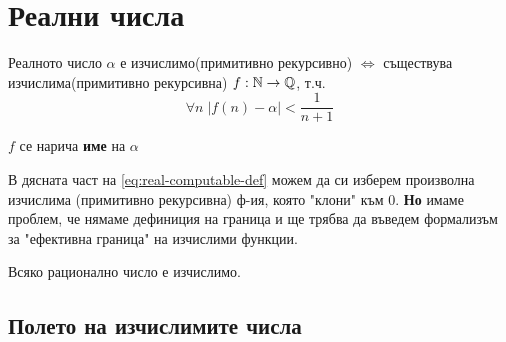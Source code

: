 \section{Реални числа}
\begin{definition}
    Реалното число $\alpha$ е изчислимо(примитивно рекурсивно) $\iff$ съществува изчислима(примитивно рекурсивна) $f: {\mathbb{N}} \to {\mathbb{Q}}$, т.ч.
    \begin{equation}\label{eq:real-computable-def}
        \forall n\; |f(n) - \alpha| < \frac{1}{n+1}
    \end{equation}
\end{definition}
\begin{notation}
    $f$ се нарича \textbf{име} на $\alpha$
\end{notation}
\begin{remark}
    В дясната част на \eqref{eq:real-computable-def} можем да си изберем произволна изчислима (примитивно рекурсивна) ф-ия, която "клони" към 0. \textbf{Но} имаме проблем, че нямаме дефиниция на граница и ще трябва да въведем формализъм за "ефективна граница" на изчислими функции.
\end{remark}
\begin{fact}
    Всяко рационално число е изчислимо.
\end{fact}

\subsection{Полето на изчислимите числа}

